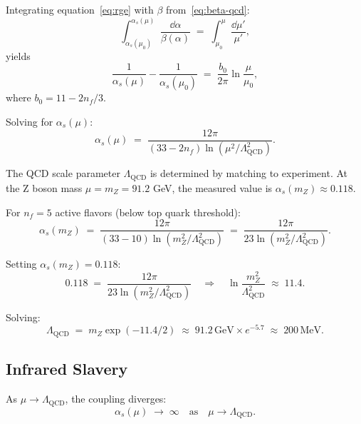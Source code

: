 \documentclass[11pt,a4paper]{article}
\theoremstyle{definition}
\theoremstyle{plain}
\theoremstyle{remark}
\begin{document}
Integrating equation~\eqref{eq:rge} with $\beta$ from~\eqref{eq:beta-qcd}:
\begin{equation}
\int_{\alpha_s(\mu_0)}^{\alpha_s(\mu)} \frac{\dd\alpha}{\beta(\alpha)} \;=\; \int_{\mu_0}^\mu \frac{\dd\mu'}{\mu'},
\end{equation}
yields
\begin{equation}
\frac{1}{\alpha_s(\mu)} - \frac{1}{\alpha_s(\mu_0)} \;=\; \frac{b_0}{2\pi}\ln\frac{\mu}{\mu_0},
\end{equation}
where $b_0 = 11 - 2n_f/3$.

Solving for $\alpha_s(\mu)$:
\begin{equation}
\alpha_s(\mu) \;=\; \frac{12\pi}{(33 - 2n_f)\ln(\mu^2/\Lambda_{\mathrm{QCD}}^2)}.
\label{eq:running-coupling}
\end{equation}

The QCD scale parameter $\Lambda_{\mathrm{QCD}}$ is determined by matching to experiment. At the Z boson mass $\mu = m_Z = 91.2$ GeV, the measured value is $\alpha_s(m_Z) \approx 0.118$.

For $n_f = 5$ active flavors (below top quark threshold):
\begin{equation}
\alpha_s(m_Z) \;=\; \frac{12\pi}{(33 - 10)\ln(m_Z^2/\Lambda_{\mathrm{QCD}}^2)} \;=\; \frac{12\pi}{23\ln(m_Z^2/\Lambda_{\mathrm{QCD}}^2)}.
\end{equation}

Setting $\alpha_s(m_Z) = 0.118$:
\begin{equation}
0.118 \;=\; \frac{12\pi}{23\ln(m_Z^2/\Lambda_{\mathrm{QCD}}^2)} \quad\Rightarrow\quad \ln\frac{m_Z^2}{\Lambda_{\mathrm{QCD}}^2} \;\approx\; 11.4.
\end{equation}

Solving:
\begin{equation}
\Lambda_{\mathrm{QCD}} \;=\; m_Z \exp(-11.4/2) \;\approx\; 91.2\,\text{GeV} \times e^{-5.7} \;\approx\; \boxed{200\,\text{MeV}.}
\label{eq:lambda-qcd}
\end{equation}

\subsection{Infrared Slavery}

As $\mu \to \Lambda_{\mathrm{QCD}}$, the coupling diverges:
\begin{equation}
\alpha_s(\mu) \;\to\; \infty \quad\text{as}\quad \mu \to \Lambda_{\mathrm{QCD}}.
\end{equation}
\end{document}

